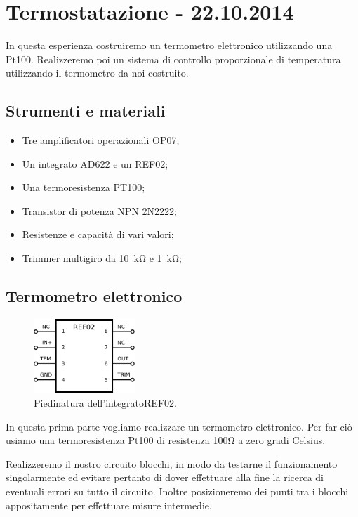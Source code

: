 \section{Termostatazione - 22.10.2014}

In questa esperienza costruiremo un termometro elettronico utilizzando una Pt100. Realizzeremo poi un sistema di controllo proporzionale di temperatura utilizzando il termometro da noi costruito. 

\subsection*{Strumenti e materiali}

\begin{itemize} [noitemsep]
		\item Tre amplificatori operazionali OP07;
		\item Un integrato AD622 e un REF02;
		\item Una termoresistenza PT100;
		\item Transistor di potenza NPN 2N2222;
		\item Resistenze e capacità di vari valori;
		\item Trimmer multigiro da \SI{10}{\kilo\ohm} e \SI{1}{\kilo\ohm};
\end{itemize}

\subsection{Termometro elettronico}

\begin{figure}
			\centering
			\includegraphics[width=3.8cm]{../E06/latex/REF02.pdf}
			\caption{Piedinatura dell'integrato\newline REF02.}
			\label{cir6:REF02}
\end{figure}

In questa prima parte vogliamo realizzare un termometro elettronico.
Per far ciò usiamo una termoresistenza Pt100 di resistenza 100\si{\ohm} a zero gradi Celsius.

Realizzeremo il nostro circuito blocchi, in modo da testarne il funzionamento singolarmente ed evitare pertanto di dover effettuare alla fine la ricerca di eventuali errori su tutto il circuito.
Inoltre posizioneremo dei punti tra i blocchi appositamente per effettuare misure intermedie.

